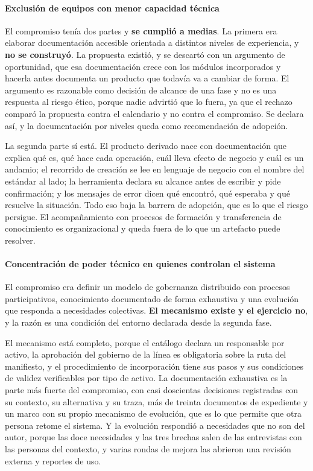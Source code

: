 \paragraph*{Exclusión de equipos con menor capacidad técnica}

El compromiso tenía dos partes y \textbf{se cumplió a medias}. La primera era
elaborar documentación accesible orientada a distintos niveles de
experiencia, y \textbf{no se construyó}. La propuesta existió, y se descartó
con un argumento de oportunidad, que esa documentación crece con los módulos
incorporados y hacerla antes documenta un producto que todavía va a cambiar
de forma. El argumento es razonable como decisión de alcance de una fase y no
es una respuesta al riesgo ético, porque nadie advirtió que lo fuera, ya que
el rechazo comparó la propuesta contra el calendario y no contra el
compromiso. Se declara así, y la documentación por niveles queda como
recomendación de adopción.

La segunda parte sí está. El producto derivado nace con documentación que
explica qué es, qué hace cada operación, cuál lleva efecto de negocio y cuál
es un andamio; el recorrido de creación se lee en lenguaje de negocio con el
nombre del estándar al lado; la herramienta declara su alcance antes de
escribir y pide confirmación; y los mensajes de error dicen qué encontró, qué
esperaba y qué resuelve la situación. Todo eso baja la barrera de adopción,
que es lo que el riesgo persigue. El acompañamiento con procesos de formación
y transferencia de conocimiento es organizacional y queda fuera de lo que un
artefacto puede resolver.

\paragraph*{Concentración de poder técnico en quienes controlan el sistema}

El compromiso era definir un modelo de gobernanza distribuido con procesos
participativos, conocimiento documentado de forma exhaustiva y una evolución
que responda a necesidades colectivas. \textbf{El mecanismo existe y el
ejercicio no}, y la razón es una condición del entorno declarada desde la
segunda fase.

El mecanismo está completo, porque el catálogo declara un responsable por
activo, la aprobación del gobierno de la línea es obligatoria sobre la ruta
del manifiesto, y el procedimiento de incorporación tiene sus pasos y sus
condiciones de validez verificables por tipo de activo. La documentación
exhaustiva es la parte más fuerte del compromiso, con casi doscientas
decisiones registradas con su contexto, su alternativa y su traza, más de
treinta documentos de expediente y un marco con su propio mecanismo de
evolución, que es lo que permite que otra persona retome el sistema. Y la
evolución respondió a necesidades que no son del autor, porque las doce
necesidades y las tres brechas salen de las entrevistas con las personas del
contexto, y varias rondas de mejora las abrieron una revisión externa y
reportes de uso.

